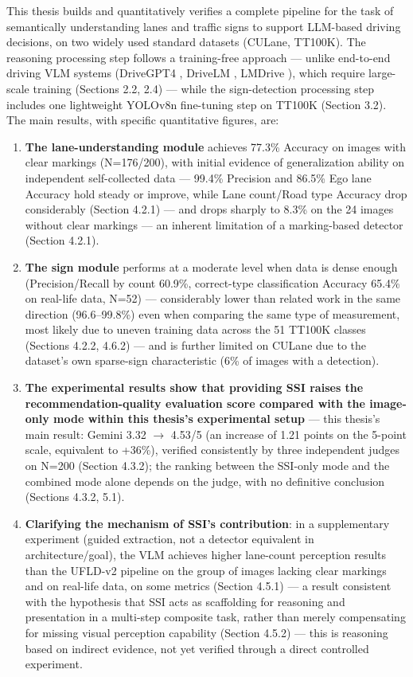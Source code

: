 \documentclass[12pt,a4paper]{report}
\begin{document}
This thesis builds and quantitatively verifies a complete pipeline for the task of semantically understanding lanes and traffic signs to support LLM-based driving decisions, on two widely used standard datasets (CULane, TT100K). The reasoning processing step follows a training-free approach --- unlike end-to-end driving VLM systems (DriveGPT4 \cite{xu2024drivegpt4}, DriveLM \cite{sima2024drivelm}, LMDrive \cite{shao2024lmdrive}), which require large-scale training (Sections 2.2, 2.4) --- while the sign-detection processing step includes one lightweight YOLOv8n fine-tuning step on TT100K (Section 3.2). The main results, with specific quantitative figures, are:

\begin{enumerate}
    \item \textbf{The lane-understanding module} achieves 77.3\% Accuracy on images with clear markings (N=176/200), with initial evidence of generalization ability on independent self-collected data --- 99.4\% Precision and 86.5\% Ego lane Accuracy hold steady or improve, while Lane count/Road type Accuracy drop considerably (Section 4.2.1) --- and drops sharply to 8.3\% on the 24 images without clear markings --- an inherent limitation of a marking-based detector (Section 4.2.1).
    \item \textbf{The sign module} performs at a moderate level when data is dense enough (Precision/Recall by count 60.9\%, correct-type classification Accuracy 65.4\% on real-life data, N=52) --- considerably lower than related work in the same direction (96.6--99.8\%) even when comparing the same type of measurement, most likely due to uneven training data across the 51 TT100K classes (Sections 4.2.2, 4.6.2) --- and is further limited on CULane due to the dataset's own sparse-sign characteristic (6\% of images with a detection).
    \item \textbf{The experimental results show that providing SSI raises the recommendation-quality evaluation score compared with the image-only mode within this thesis's experimental setup} --- this thesis's main result: Gemini 3.32 $\to$ 4.53/5 (an increase of 1.21 points on the 5-point scale, equivalent to +36\%), verified consistently by three independent judges on N=200 (Section 4.3.2); the ranking between the SSI-only mode and the combined mode alone depends on the judge, with no definitive conclusion (Sections 4.3.2, 5.1).
    \item \textbf{Clarifying the mechanism of SSI's contribution}: in a supplementary experiment (guided extraction, not a detector equivalent in architecture/goal), the VLM achieves higher lane-count perception results than the UFLD-v2 pipeline on the group of images lacking clear markings and on real-life data, on some metrics (Section 4.5.1) --- a result consistent with the hypothesis that SSI acts as scaffolding for reasoning and presentation in a multi-step composite task, rather than merely compensating for missing visual perception capability (Section 4.5.2) --- this is reasoning based on indirect evidence, not yet verified through a direct controlled experiment.

\end{enumerate}
\end{document}
